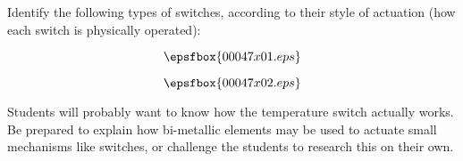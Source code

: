 

Identify the following types of switches, according to their style of actuation (how each switch is physically operated):

$$\epsfbox{00047x01.eps}$$







$$\epsfbox{00047x02.eps}$$







Students will probably want to know how the temperature switch actually works.  Be prepared to explain how bi-metallic elements may be used to actuate small mechanisms like switches, or challenge the students to research this on their own.




